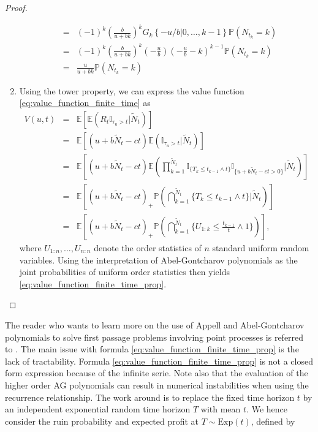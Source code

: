 \begin{proof}
\begin{enumerate}
\begin{eqnarray*}
&=&(-1)^k\left(\frac{b}{u+bk}\right)^{k}G_{k}\left\{-u/b|0, \ldots, k-1\right\}\mathbb{P}(N_{t_k} = k)\\
&=&(-1)^k\left(\frac{b}{u+bk}\right)^{k}\left(-\frac{u}{b}\right)\left(-\frac{u}{b}-k\right)^{k-1}\mathbb{P}(N_{t_k} = k)\\
&=& \frac{u}{u+bk}\mathbb{P}(N_{t_k} = k)
\end{eqnarray*}
\item Using the tower property, we can express the value function \eqref{eq:value_function_finite_time} as 
\begin{eqnarray}
V(u,t) &=&  \mathbb{E}\left[\mathbb{E}\left(R_t\mathbb{I}_{\tau_u>t}\Big\rvert \tilde{N}_t\right)\right]\nonumber\\
&=&\mathbb{E}\left[\left(u+b\tilde{N}_t - ct\right)\mathbb{E}\left(\mathbb{I}_{\tau_u>t}\Big\rvert \tilde{N}_t\right)\right]\nonumber\\
&=&\mathbb{E}\left[\left(u+b\tilde{N}_t - ct\right)\mathbb{E}\left(\prod_{k = 1}^{\tilde{N}_t}\mathbb{I}_{\{T_k \leq t_{k-1}\land t\}}\mathbb{I}_{\{u+b\tilde{N}_t-ct>0\}}\Big\rvert \tilde{N}_t\right)\right]\nonumber\\
&=&\mathbb{E}\left[\left(u+b\tilde{N}_t - ct\right)_+\mathbb{P}\left(\bigcap_{k = 1}^{\tilde{N}_t}\{T_k \leq t_{k-1}\land t\}\Big\rvert \tilde{N}_t\right)\right]\nonumber\\
&=&\mathbb{E}\left[\left(u+b\tilde{N}_t - ct\right)_+\mathbb{P}\left(\bigcap_{k = 1}^{\tilde{N}_t}\{U_{1:k} \leq \frac{t_{k-1}}{t}\land 1\}\right)\right],
\end{eqnarray}
where $U_{1:n},\ldots, U_{n:n}$ denote the order statistics of $n$ \iid standard uniform random variables. Using the interpretation of Abel-Gontcharov polynomials as the joint probabilities of uniform order statistics then yields \eqref{eq:value_function_finite_time_prop}.
\end{enumerate}
\end{proof}
\noindent The reader who wants to learn more on the use of Appell and Abel-Gontcharov polynomials to solve first passage problems involving point processes is referred to \citet{Goffard2017}. The main issue with formula \eqref{eq:value_function_finite_time_prop} is the lack of tractability. Formula \eqref{eq:value_function_finite_time_prop} is not a closed form expression because of the infinite serie. Note also that the evaluation of the higher order AG polynomials can result in numerical instabilities when using the recurrence relationship. The work around is to replace the fixed time horizon $t$ by an independent exponential random time horizon $T$ with mean $t$. We hence consider the ruin probability and expected profit at $T\sim \text{Exp}(t)$, defined by
